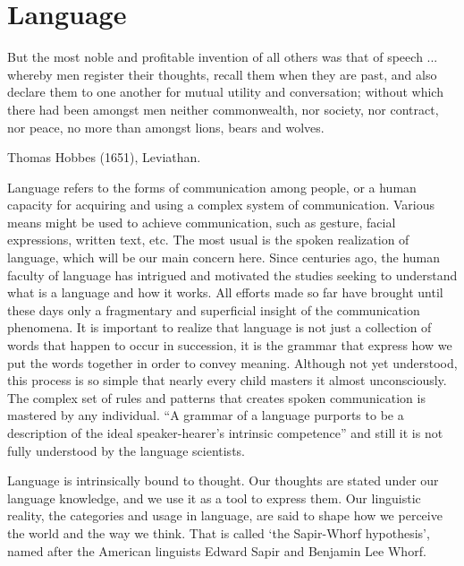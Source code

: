\chapter{Language}
\epigraph{But the most noble and profitable invention of all others was that of speech ... whereby men register their thoughts, recall them when they are past, and also declare them to one another for mutual utility and conversation; without which there had been amongst men neither commonwealth, nor society, nor contract, nor peace, no more than amongst lions, bears and wolves.}{Thomas Hobbes (1651), Leviathan.}

Language refers to the forms of communication among people, or a human capacity for acquiring and using a complex system
of communication. Various means might be used to achieve communication, such as gesture, facial expressions, written text, etc.
The most usual is the spoken realization of language, which will be our main concern here.
Since centuries ago, the human faculty of language has intrigued and motivated the studies seeking to
understand what is a language and how it works.
All efforts made so far have brought until these days only a fragmentary and superficial 
insight of the communication phenomena. 
It is important to realize that language is not just a collection of words that happen
to occur in succession, it is the grammar that express how we put the words together in
order to convey %
meaning. 
Although not yet understood, this process is so simple that nearly every child 
masters it almost unconsciously.
The complex set of rules and patterns that creates spoken communication is
mastered by any individual.
``A grammar of a language purports to be a description of the ideal 
speaker-hearer's intrinsic competence'' \citep{chomsky1969}
and still it is not fully understood by the language scientists. 

Language is intrinsically bound to thought. Our thoughts are stated under our language knowledge, 
and we use it as a tool to express them. 
Our linguistic reality, the categories and usage in language, are said to shape how we perceive the world and the way we think. 
That is called `the Sapir-Whorf hypothesis', named after the American linguists Edward Sapir and Benjamin Lee Whorf. 

